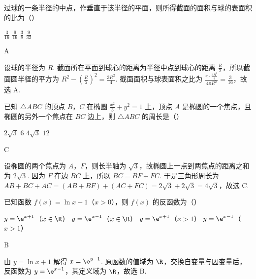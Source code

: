 \begin{problem}
过球的一条半径的中点，作垂直于该半径的平面，则所得截面的面积与球的表面积的比为（\quad）

\choices
    {\(\frac{3}{16}\)}
    {\(\frac{9}{16}\)}
    {\(\frac{3}{8}\)}
    {\(\frac{9}{32}\)}
\end{problem}

\begin{answer}
A
\end{answer}

\begin{solution}
设球的半径为 \(R\). 截面所在平面到球心的距离为半径中点到球心的距离 \(\frac R2\)，所以截面圆半径的平方为
\(R^2-\left(\frac R2\right)^2=\frac{3R^2}{4}\). 截面面积与球表面积之比为
\(\frac{\pi\cdot\frac{3R^2}{4}}{4\pi R^2}=\frac{3}{16}\)，故选 A.
\end{solution}

\begin{problem}
已知 \(\triangle ABC\) 的顶点 \(B\)，\(C\) 在椭圆 \(\frac{x^2}{3} + y^2 = 1\) 上，顶点 \(A\) 是椭圆的一个焦点，且椭圆的另外一个焦点在 \(BC\) 边上，则 \(\triangle ABC\) 的周长是（\quad）

\choices
    {\(2\sqrt{3}\)}
    {\(6\)}
    {\(4\sqrt{3}\)}
    {\(12\)}
\end{problem}

\begin{answer}
C
\end{answer}

\begin{solution}
设椭圆的两个焦点为 \(A\)，\(F\)，则长半轴为 \(\sqrt3\)，故椭圆上一点到两焦点的距离之和为 \(2\sqrt3\). 因为 \(F\) 在边 \(BC\) 上，所以 \(BC=BF+FC\). 于是三角形周长为
\(AB+BC+AC=(AB+BF)+(AC+FC)=2\sqrt3+2\sqrt3=4\sqrt3\)，故选 C.
\end{solution}

\begin{problem}
已知函数 \(f(x) = \ln x + 1\)（\(x > 0\)），则 \(f(x)\) 的反函数为（\quad）

\choices
    {\(y = \e^{x + 1}\)（\(x \in \R\)）}
    {\(y = \e^{x - 1}\)（\(x \in \R\)）}
    {\(y = \e^{x + 1}\)（\(x > 1\)）}
    {\(y = \e^{x - 1}\)（\(x > 1\)）}
\end{problem}

\begin{answer}
B
\end{answer}

\begin{solution}
由 \(y=\ln x+1\) 解得 \(x=\e^{y-1}\). 原函数的值域为 \(\R\)，交换自变量与因变量后，反函数为 \(y=\e^{x-1}\)，其定义域为 \(\R\)，故选 B.
\end{solution}

